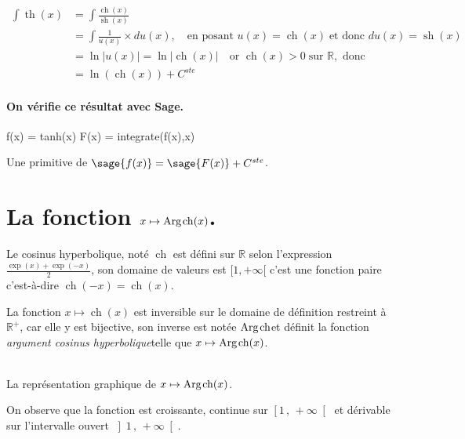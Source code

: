 \documentclass[a4paper,landscape,17pt]{extreport} %
\def\eclaire{\mathbb}
\def\R{\ensuremath{\eclaire R}}
\renewcommand{\sinh}{\mathop{\mathrm{sh}}}
\renewcommand{\cosh}{\mathop{\mathrm{ch}}}
\renewcommand{\tanh}{\mathop{\mathrm{th}}}
\renewcommand{\arg}{\mathop{\mathrm{Arg}}}
\begin{document}
\begin{align*}
\int \tanh(x) & = \int \frac{\cosh(x)}{\sinh(x)} \\
&  =  \int \frac{1}{u(x)} \times du(x), \quad \textrm{en posant } u(x) =  \cosh(x) \; \textrm{et donc } du(x) = \sinh(x) \\
&  =  \ln|u(x)| = \ln|\cosh(x)|  \quad \textrm{or } \cosh(x)>0 \; \textrm{sur } \R ,  \textrm{ donc}\\
&  =   \ln\left(\cosh(x)\right) + C^{ste} 
\end{align*}


\paragraph{On vérifie ce résultat avec Sage.}



\begin{sageblock}
    f(x) = tanh(x)
    F(x) = integrate(f(x),x)
\end{sageblock}

Une primitive de $\sage{f(x)} = \sage{F(x)} + C^{ste}$.




\section{La fonction  $x \mapsto \arg\mspace{-1mu}\cosh(x)$.}

Le cosinus hyperbolique, noté $\cosh$ est défini sur $\R$ selon l'expression $\frac{\exp(x)+\exp(-x)}{2}$, son domaine de valeurs est $[1, +\infty [$ 
c'est une fonction paire c'est-à-dire $\cosh(-x)=\cosh(x)$.


La fonction $x \mapsto \cosh(x)$ est inversible sur le domaine de définition restreint à $\R^+$, car elle y est bijective, son inverse est notée \og $ \arg\mspace{-1mu}\cosh $\fg et définit la fonction \og\emph{argument cosinus hyperbolique}\fg telle que $x \mapsto \arg\mspace{-1mu}\cosh(x)$.


\begin{center}
 \\
La représentation graphique de $x \mapsto \arg\mspace{-1mu}\cosh(x)$.
\end{center}
On observe que la fonction est croissante, continue sur $\left[1\,,\,+\infty \right[ $ et dérivable sur l'intervalle ouvert $\left]1\,,\,+\infty \right[ $.
                                                                                               
\end{document}

